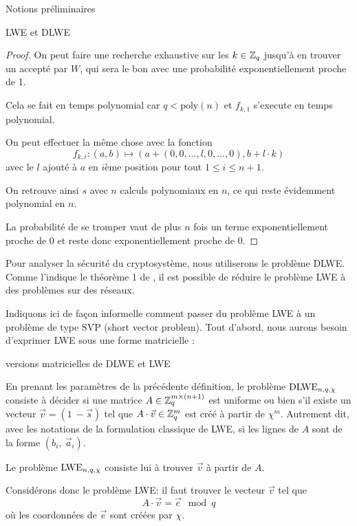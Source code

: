 \begin{section}{Notions préliminaires}
\begin{subsection}{LWE et DLWE}
\begin{proof}
	On peut faire une recherche exhaustive sur les $k \in \mathbb{Z}_q$ jusqu'à en trouver un accepté par $W$, qui sera le
	bon avec une probabilité exponentiellement proche de 1.
	
	Cela se fait en temps polynomial car $q < \text{poly}(n)$ et $f_{k,1}$ s'execute en temps polynomial.
	
	On peut effectuer la même chose avec la fonction
	\[f_{k,i}: (a,b) \mapsto (a + (0, 0, ..., l, 0, ..., 0), b + l \cdot k) \]
	avec le $l$ ajouté à $a$ en $i$ème position pour tout $1 \leqslant i \leqslant n+1$.
	
	On retrouve ainsi $s$ avec $n$ calculs polynomiaux en $n$, ce qui reste évidemment polynomial en $n$.
	
	La probabilité de se tromper vaut de plus $n$ fois un terme exponentiellement proche de 0 et reste donc
	exponentiellement proche de 0.
	\end{proof}

	Pour analyser la sécurité du cryptosystème, nous utiliserons le problème DLWE. Comme l'indique le théorème 1 de
	\cite{C:GenSahWat13}, il est possible de réduire le problème LWE à des problèmes sur des réseaux.

	Indiquons ici de façon informelle comment passer du problème LWE à un problème de type SVP (short vector
	problem). Tout d'abord, nous aurons besoin d'exprimer LWE sous une forme matricielle :

	\begin{definition}{versions matricielles de DLWE et LWE}

	En prenant les paramètres de la précédente définition, le problème $\text{DLWE}_{n,q,\chi}$ consiste à décider si une matrice $A
	\in \mathbb{Z}_q^{m \times (n+1)}$ est uniforme ou bien s'il existe un vecteur $\vec{v} = (1\: -\!\vec{s})$ tel que $A
	\cdot \vec{v} \in \mathbb{Z}_q^{m}$ est créé à partir de $\chi^m$. Autrement dit, avec les notations de la formulation
	classique de LWE, si les lignes de $A$ sont de la forme $(b_i,\: \vec{a}_i)$.
	
	Le problème $\text{LWE}_{n,q,\chi}$ consiste lui à trouver $\vec{v}$ à partir de $A$.
	\end{definition}

	Considérons donc le problème LWE: il faut trouver le vecteur $\vec{v}$ tel que
	\[ A\cdot \vec{v} = \vec{e} \mod q \]
	où les coordonnées de $\vec{e}$ sont créées par $\chi$.


\end{subsection}
\end{section}
